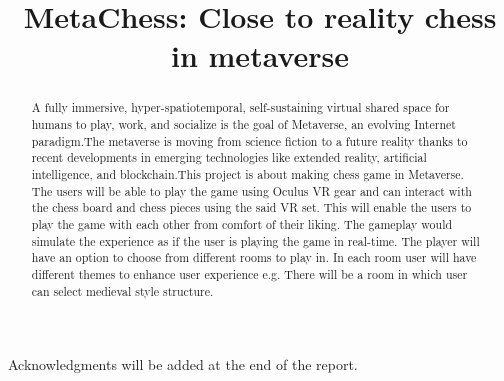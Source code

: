 \documentclass{fast-nuces-bs}
\title{MetaChess: Close to reality chess in metaverse}
\begin{document}
\begin{acknowledgements}
	Acknowledgments will be added at the end of the report.
\end{acknowledgements}

\begin{abstract}
A fully immersive, hyper-spatiotemporal, self-sustaining virtual shared space for humans to play, work, and socialize is the goal of Metaverse, an evolving Internet paradigm.The metaverse is moving from science fiction to a future reality thanks to recent developments in emerging technologies like extended reality, artificial intelligence, and blockchain.This project is about making chess game in Metaverse. The users will be able to play the game using Oculus VR gear and can interact with the chess board and chess pieces using the said VR set. This will enable the users to play the game with each other from comfort of their liking. The gameplay would simulate the experience as if the user is playing the game in real-time. The player will have an option to choose from different rooms to play in. In each room user will have different themes to enhance user experience e.g. There will be a room in which user can select medieval style structure. 
\end{abstract}















%


 
\end{document}
